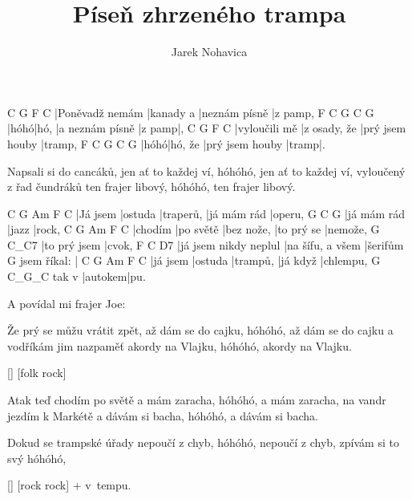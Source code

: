 \documentclass{song}
\author{Jarek Nohavica}
\title{Píseň zhrzeného trampa}
\begin{document}
\strophe
C               G         F             C
|Poněvadž nemám |kanady a |neznám písně |z pamp,
F    C    G               C      G
|hóhó|hó, |a neznám písně |z pamp|,
C             G            F               C
|vyloučili mě |z osady, že |prý jsem houby |tramp,
F    C       G               C     G
|hóhó|hó, že |prý jsem houby |tramp|.
\endstrophe

\strophe*
Napsali si do cancáků, jen ať to každej ví,
hóhóhó, jen ať to každej ví,
vyloučený z řad čundráků ten frajer libový,
hóhóhó, ten frajer libový.
\endstrophe

C        G       Am        F           C
|Já jsem |ostuda |traperů, |já mám rád |operu,
G           C     G
|já mám rád |jazz |rock,
C       G         Am         F          C
|chodím |po světě |bez nože, |to prý se |nemože,
G            C_C7
|to prý jsem |cvok,
F                     C                D7
|já jsem nikdy neplul |na šífu, a všem |šerifům
            G
jsem říkal: |
C        G       Am       F        C
|já jsem |ostuda |trampů, |já když |chlempu,
      G       C_G_C
tak v |autokem|pu.
\endstrophe

\bigskip

\begin{multicols}{2}

\strophe*
A povídal mi frajer Joe: 
\endstrophe

\strophe*
Že prý se můžu vrátit zpět, až dám se do cajku,
hóhóhó, až dám se do cajku
a vodříkám jim nazpaměť akordy na Vlajku,
hóhóhó, akordy na Vlajku.
\endstrophe

\ref{} [folk rock]

\columnbreak

\strophe*
Atak teď chodím po světě a mám zaracha,
hóhóhó, a mám zaracha,
na vandr jezdím k Markétě a dávám si bacha,
hóhóhó, a dávám si bacha.
\endstrophe

\strophe*
Dokud se trampské úřady nepoučí z chyb,
hóhóhó, nepoučí z chyb,
zpívám si to svý 
hóhóhó, 
\endstrophe

\ref{} [rock rock] + v~tempu.

\end{multicols}
\end{document}
